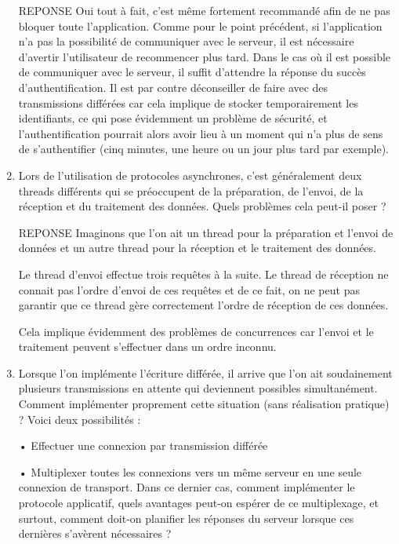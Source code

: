 \documentclass[a4paper]{article}
\begin{document}
\begin{enumerate}
    REPONSE
    Oui tout à fait, c'est même fortement recommandé afin de ne pas bloquer toute l'application. Comme pour le point précédent, si l'application n'a pas la possibilité de communiquer avec le serveur, il est nécessaire d'avertir l'utilisateur de recommencer plus tard. Dans le cas où il est possible de communiquer avec le serveur, il suffit d'attendre la réponse du succès d'authentification. Il est par contre déconseiller de faire avec des transmissions différées car cela implique de stocker temporairement les identifiants, ce qui pose évidemment un problème de sécurité, et l'authentification pourrait alors avoir lieu à un moment qui n'a plus de sens de s'authentifier (cinq minutes, une heure ou un jour plus tard par exemple).
    
    \item Lors de l'utilisation de protocoles asynchrones, c'est généralement deux threads différents qui se préoccupent de la préparation, de l'envoi, de la réception et du traitement des données. Quels problèmes cela peut-il poser ?
    
    REPONSE
    Imaginons que l'on ait un thread pour la préparation et l'envoi de données et un autre thread pour la réception et le traitement des données.
    
    Le thread d'envoi effectue trois requêtes à la suite. Le thread de réception ne connait pas l'ordre d'envoi de ces requêtes et de ce fait, on ne peut pas garantir que ce thread gère correctement l'ordre de réception de ces données.
    
    Cela implique évidemment des problèmes de concurrences car l'envoi et le traitement peuvent s'effectuer dans un ordre inconnu.
    
    \item Lorsque l'on implémente l'écriture différée, il arrive que l'on ait soudainement plusieurs transmissions en attente qui deviennent possibles simultanément. Comment implémenter proprement cette situation (sans réalisation pratique) ? Voici deux possibilités :
    
    • Effectuer une connexion par transmission différée
    
    • Multiplexer toutes les connexions vers un même serveur en une seule connexion de transport.
    Dans ce dernier cas, comment implémenter le protocole applicatif, quels avantages peut-on
    espérer de ce multiplexage, et surtout, comment doit-on planifier les réponses du serveur
    lorsque ces dernières s'avèrent nécessaires ?
    

\end{enumerate}
\end{document}
